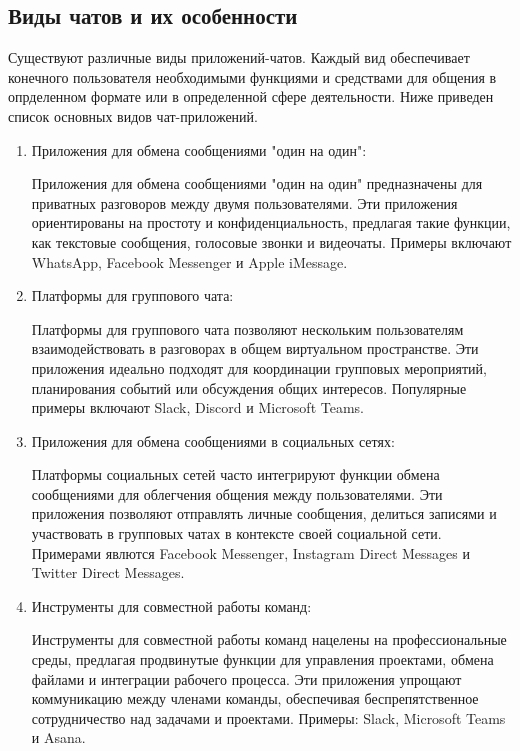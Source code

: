 \subsection{Виды чатов и их особенности}

Существуют различные виды приложений-чатов. Каждый вид обеспечивает конечного пользователя необходимыми функциями и средствами для общения в опрделенном формате или в определенной сфере деятельности. Ниже приведен список основных видов чат-приложений.

\begin{enumerate}
	\item Приложения для обмена сообщениями "один на один":
	
	Приложения для обмена сообщениями "один на один" предназначены для приватных разговоров между двумя пользователями. Эти приложения ориентированы на простоту и конфиденциальность, предлагая такие функции, как текстовые сообщения, голосовые звонки и видеочаты. Примеры включают WhatsApp, Facebook Messenger и Apple iMessage.
	
	\item Платформы для группового чата:
	
	Платформы для группового чата позволяют нескольким пользователям взаимодействовать в разговорах в общем виртуальном пространстве. Эти приложения идеально подходят для координации групповых мероприятий, планирования событий или обсуждения общих интересов. Популярные примеры включают Slack, Discord и Microsoft Teams.
	
	\item Приложения для обмена сообщениями в социальных сетях:
	
	Платформы социальных сетей часто интегрируют функции обмена сообщениями для облегчения общения между пользователями. Эти приложения позволяют отправлять личные сообщения, делиться записями и участвовать в групповых чатах в контексте своей социальной сети. Примерами явлются Facebook Messenger, Instagram Direct Messages и Twitter Direct Messages.
	
	\item Инструменты для совместной работы команд:
	
	Инструменты для совместной работы команд нацелены на профессиональные среды, предлагая продвинутые функции для управления проектами, обмена файлами и интеграции рабочего процесса. Эти приложения упрощают коммуникацию между членами команды, обеспечивая беспрепятственное сотрудничество над задачами и проектами. Примеры: Slack, Microsoft Teams и Asana.
	

\end{enumerate}
